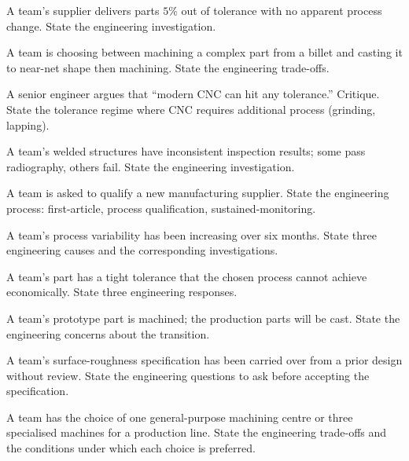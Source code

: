 \begin{exercise}
A team's supplier delivers parts $5\%$ out of tolerance with no apparent process change. State the engineering investigation.
\end{exercise}

\begin{exercise}
A team is choosing between machining a complex part from a billet and casting it to near-net shape then machining. State the engineering trade-offs.
\end{exercise}

\begin{exercise}
A senior engineer argues that ``modern CNC can hit any tolerance.'' Critique. State the tolerance regime where CNC requires additional process (grinding, lapping).
\end{exercise}

\begin{exercise}
A team's welded structures have inconsistent inspection results; some pass radiography, others fail. State the engineering investigation.
\end{exercise}

\begin{exercise}
A team is asked to qualify a new manufacturing supplier. State the engineering process: first-article, process qualification, sustained-monitoring.
\end{exercise}

\begin{exercise}
A team's process variability has been increasing over six months. State three engineering causes and the corresponding investigations.
\end{exercise}

\begin{exercise}
A team's part has a tight tolerance that the chosen process cannot achieve economically. State three engineering responses.
\end{exercise}

\begin{exercise}
A team's prototype part is machined; the production parts will be cast. State the engineering concerns about the transition.
\end{exercise}

\begin{exercise}
A team's surface-roughness specification has been carried over from a prior design without review. State the engineering questions to ask before accepting the specification.
\end{exercise}

\begin{exercise}
A team has the choice of one general-purpose machining centre or three specialised machines for a production line. State the engineering trade-offs and the conditions under which each choice is preferred.
\end{exercise}

